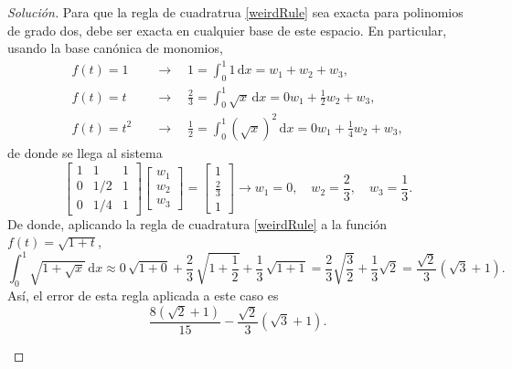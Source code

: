 \documentclass[letterpaper,12pt]{article}
\theoremstyle{definition}
\numberwithin{equation}{question}
\newenvironment{solution}{\begin{proof}[Solución]}{\end{proof}}
\begin{document}
\begin{solution}
Para que la regla de cuadratrua \eqref{weirdRule} sea exacta para polinomios de grado dos, debe ser exacta en cualquier base de este espacio. En particular, usando la base can\'onica de monomios,
\begin{align*}
f(t)=1 		&\quad\longrightarrow\quad 1=\int_0^1 1 \, \mathrm{d}x = w_1+w_2+w_3,\\
f(t)=t 		&\quad\longrightarrow\quad \frac{2}{3}=\int_0^1 \sqrt{x} \, \mathrm{d}x = 0w_1+\frac{1}{2}w_2+w_3,\\
f(t)=t^2	&\quad\longrightarrow\quad \frac{1}{2}=\int_0^1 \left(\sqrt{x}\right)^2 \, \mathrm{d}x = 0w_1+\frac{1}{4}w_2+w_3,
\end{align*}
de donde se llega al sistema
$$
\begin{bmatrix}
1 & 1 & 1 \\
0 & 1/2 & 1\\
0 & 1/4 & 1 
\end{bmatrix}
\begin{bmatrix}
w_1\\w_2\\w_3
\end{bmatrix}
=
\begin{bmatrix}
1\\ \frac{2}{3}\\1
\end{bmatrix}
\rightarrow
w_1 = 0,\quad
w_2 = \frac{2}{3},\quad
w_3 = \frac{1}{3}.
$$
De donde, aplicando la regla de cuadratura \eqref{weirdRule} a la función $f(t) = \sqrt{1+t}$,
\begin{equation*}
\displaystyle \int_0^1\sqrt{1+\sqrt{x}} \, \mathrm{d}x \approx
0 \, \sqrt{1+0} + \frac{2}{3} \, \sqrt{1+\frac{1}{2}} + \frac{1}{3} \, \sqrt{1+1}
= \frac{2}{3} \sqrt{\frac{3}{2}} + \frac{1}{3} \sqrt{2}
= \frac{\sqrt{2}}{3} (\sqrt{3} + 1).
\end{equation*}
As\'i, el error de esta regla aplicada a este caso es
$$
\frac{8(\sqrt{2}+1)}{15} - \frac{\sqrt{2}}{3} (\sqrt{3} + 1).
$$
\bigskip
\begin{center}\end{center}

\end{solution}
\end{document}
